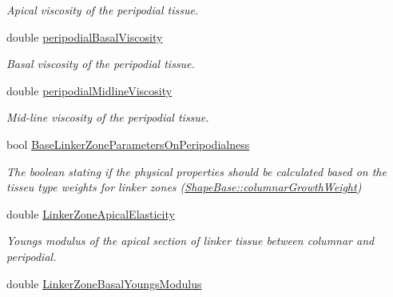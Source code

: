 \begin{DoxyCompactItemize}
\begin{DoxyCompactList}\small\item\em Apical viscosity of the peripodial tissue. \end{DoxyCompactList}\item 
\hypertarget{classSimulation_aa37b9f5ae1a1711bf6905ea1525fb1f4}{}double \hyperlink{classSimulation_aa37b9f5ae1a1711bf6905ea1525fb1f4}{peripodial\+Basal\+Viscosity}\label{classSimulation_aa37b9f5ae1a1711bf6905ea1525fb1f4}

\begin{DoxyCompactList}\small\item\em Basal viscosity of the peripodial tissue. \end{DoxyCompactList}\item 
\hypertarget{classSimulation_a92b5bdeb108bfc8816cd90eddbe49067}{}double \hyperlink{classSimulation_a92b5bdeb108bfc8816cd90eddbe49067}{peripodial\+Midline\+Viscosity}\label{classSimulation_a92b5bdeb108bfc8816cd90eddbe49067}

\begin{DoxyCompactList}\small\item\em Mid-\/line viscosity of the peripodial tissue. \end{DoxyCompactList}\item 
\hypertarget{classSimulation_a7c6f3faf5d16e41aa43c9a71fb67d1b8}{}bool \hyperlink{classSimulation_a7c6f3faf5d16e41aa43c9a71fb67d1b8}{Base\+Linker\+Zone\+Parameters\+On\+Peripodialness}\label{classSimulation_a7c6f3faf5d16e41aa43c9a71fb67d1b8}

\begin{DoxyCompactList}\small\item\em The boolean stating if the physical properties should be calculated based on the tisseu type weights for linker zones (\hyperlink{classShapeBase_a134d82ba500ef829b6aa3e3a83783c9a}{Shape\+Base\+::columnar\+Growth\+Weight}) \end{DoxyCompactList}\item 
\hypertarget{classSimulation_aaa5d205910274dd5be4976b87ab20abc}{}double \hyperlink{classSimulation_aaa5d205910274dd5be4976b87ab20abc}{Linker\+Zone\+Apical\+Elasticity}\label{classSimulation_aaa5d205910274dd5be4976b87ab20abc}

\begin{DoxyCompactList}\small\item\em Young\textquotesingle{}s modulus of the apical section of linker tissue between columnar and peripodial. \end{DoxyCompactList}\item 
\hypertarget{classSimulation_a07cf19fd8a3e78d4644563b3c9c030ee}{}double \hyperlink{classSimulation_a07cf19fd8a3e78d4644563b3c9c030ee}{Linker\+Zone\+Basal\+Youngs\+Modulus}\label{classSimulation_a07cf19fd8a3e78d4644563b3c9c030ee}


\end{DoxyCompactItemize}
